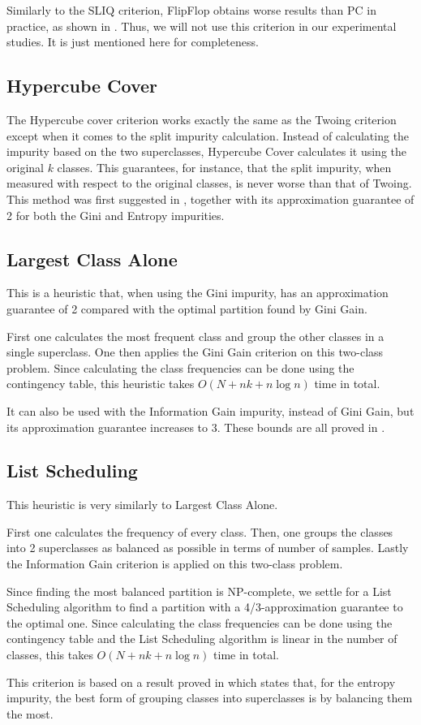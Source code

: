 Similarly to the SLIQ criterion, FlipFlop obtains worse results than PC in practice, as shown in \cite{journals/datamine/CoppersmithHH99}. Thus, we will not use this criterion in our experimental studies. It is just mentioned here for completeness.


\subsection{Hypercube Cover}

The Hypercube cover criterion works exactly the same as the Twoing criterion except when it comes to the split impurity calculation. Instead of calculating the impurity based on the two superclasses, Hypercube Cover calculates it using the original $k$ classes. This guarantees, for instance, that the split impurity, when measured with respect to the original classes, is never worse than that of Twoing. This method was first suggested in \cite{icml2018}, together with its approximation guarantee of 2 for both the Gini and Entropy impurities.


\subsection{Largest Class Alone}

This is a heuristic that, when using the Gini impurity, has an approximation guarantee of 2 compared with the optimal partition found by Gini Gain.

First one calculates the most frequent class and group the other classes in a single superclass. One then applies the Gini Gain criterion on this two-class problem. Since calculating the class frequencies can be done using the contingency table, this heuristic takes $O(N + n k + n \log n)$ time in total.

It can also be used with the Information Gain impurity, instead of Gini Gain, but its approximation guarantee increases to 3. These bounds are all proved in \cite{icml2018}.

\subsection{List Scheduling}

This heuristic is very similarly to Largest Class Alone.

First one calculates the frequency of every class. Then, one groups the classes into 2 superclasses as balanced as possible in terms of number of samples. Lastly the Information Gain criterion is applied on this two-class problem.

Since finding the most balanced partition is NP-complete, we settle for a List Scheduling algorithm to find a partition with a 4/3-approximation guarantee to the optimal one. Since calculating the class frequencies can be done using the contingency table and the List Scheduling algorithm is linear in the number of classes, this takes $O(N + n k + n \log n)$ time in total.

This criterion is based on a result proved in \cite{icml2018} which states that, for the entropy impurity, the best form of grouping classes into superclasses is by balancing them the most.